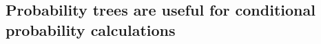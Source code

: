 \documentclass[slidestop,compress,mathserif,11pt,t,professionalfonts,xcolor=table]{beamer}
\begin{document}
%
%
%
%
%
%
%
%
%
%
%
%
%
%
%


\begin{frame}
\frametitle{}

\vfill


\vfill

\end{frame}



\subsection{Probability trees are useful for conditional probability calculations}
\label{mi1}
\end{document}
